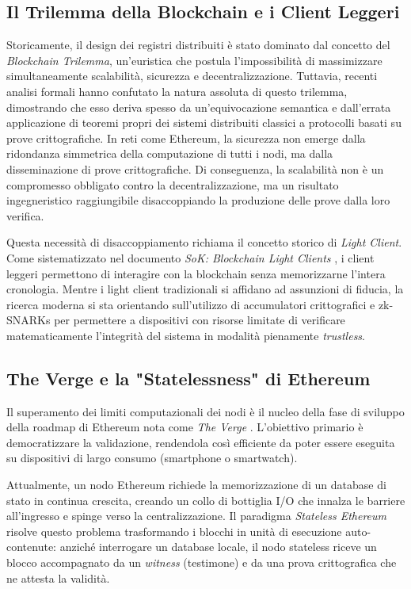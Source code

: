 \documentclass[12pt,a4paper,openright,twoside]{report}
\begin{document}
\subsection{Il Trilemma della Blockchain e i Client Leggeri}

Storicamente, il design dei registri distribuiti è stato dominato dal concetto del \textit{Blockchain Trilemma}, un'euristica che postula l'impossibilità di massimizzare simultaneamente scalabilità, sicurezza e decentralizzazione. Tuttavia, recenti analisi formali \cite{trilemma_rebuttal} hanno confutato la natura assoluta di questo trilemma, dimostrando che esso deriva spesso da un'equivocazione semantica e dall'errata applicazione di teoremi propri dei sistemi distribuiti classici a protocolli basati su prove crittografiche. In reti come Ethereum, la sicurezza non emerge dalla ridondanza simmetrica della computazione di tutti i nodi, ma dalla disseminazione di prove crittografiche. Di conseguenza, la scalabilità non è un compromesso obbligato contro la decentralizzazione, ma un risultato ingegneristico raggiungibile disaccoppiando la produzione delle prove dalla loro verifica.

Questa necessità di disaccoppiamento richiama il concetto storico di \textit{Light Client}. Come sistematizzato nel documento \textit{SoK: Blockchain Light Clients} \cite{blockchain_light_clients}, i client leggeri permettono di interagire con la blockchain senza memorizzarne l'intera cronologia. Mentre i light client tradizionali si affidano ad assunzioni di fiducia, la ricerca moderna si sta orientando sull'utilizzo di accumulatori crittografici e zk-SNARKs per permettere a dispositivi con risorse limitate di verificare matematicamente l'integrità del sistema in modalità pienamente \textit{trustless}.

\subsection{The Verge e la "Statelessness" di Ethereum}

Il superamento dei limiti computazionali dei nodi è il nucleo della fase di sviluppo della roadmap di Ethereum nota come \textit{The Verge} \cite{verge_2024}. L'obiettivo primario è democratizzare la validazione, rendendola così efficiente da poter essere eseguita su dispositivi di largo consumo (smartphone o smartwatch). 

Attualmente, un nodo Ethereum richiede la memorizzazione di un database di stato in continua crescita, creando un collo di bottiglia I/O che innalza le barriere all'ingresso e spinge verso la centralizzazione. Il paradigma \textit{Stateless Ethereum} \cite{stateless_book} risolve questo problema trasformando i blocchi in unità di esecuzione auto-contenute: anziché interrogare un database locale, il nodo stateless riceve un blocco accompagnato da un \textit{witness} (testimone) e da una prova crittografica che ne attesta la validità. 
\end{document}
